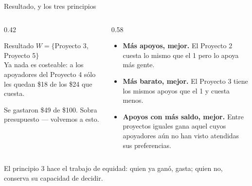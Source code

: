 \documentclass[11pt, aspectratio=169]{beamer}
\begin{document}
\begin{frame}{Resultado, y los tres principios}
  \begin{columns}[T]
    \begin{column}{0.42\textwidth}
      \begin{block}{Resultado}
        $W = \{$Proyecto 3, Proyecto 5$\}$ \\[0.3em]
        Ya nada es costeable: a los apoyadores del Proyecto 4 sólo les quedan
        \$18 de los \$24 que cuesta.
      \end{block}
      {\small Se gastaron \$49 de \$100. \alert{Sobra presupuesto} --- volvemos
      a esto.}
    \end{column}
    \begin{column}{0.58\textwidth}
      \begin{itemize}\small
        \item[\textcolor{mesdark}{\textbf{1.}}] \textbf{Más apoyos, mejor.}
          El Proyecto 2 cuesta lo mismo que el 1 pero lo apoya más gente.
        \item[\textcolor{mesdark}{\textbf{2.}}] \textbf{Más barato, mejor.}
          El Proyecto 3 tiene los mismos apoyos que el 1 y cuesta menos.
        \item[\textcolor{mesdark}{\textbf{3.}}] \textbf{Apoyos con más saldo,
          mejor.} Entre proyectos iguales gana aquel cuyos apoyadores aún no
          han visto atendidas sus preferencias.
      \end{itemize}
    \end{column}
  \end{columns}

  \vspace{0.4em}
  \centering
  {\small El principio 3 hace el trabajo de equidad: quien ya ganó, gasta; quien
  no, conserva su capacidad de decidir.}
\end{frame}
\end{document}
